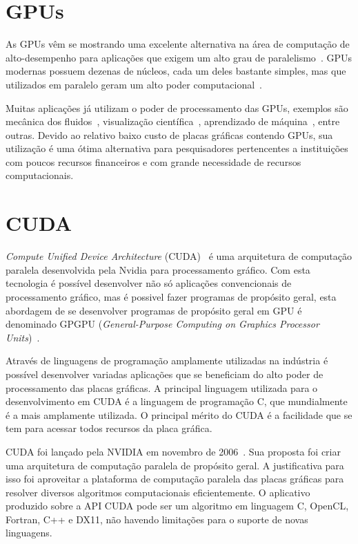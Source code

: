 \section{GPUs}\label{intro:historico}

As GPUs vêm se mostrando uma excelente alternativa na área de computação de alto-desempenho para aplicações que exigem um alto grau de paralelismo~\citep{gpu}. GPUs modernas possuem dezenas de núcleos, cada um deles bastante simples, mas que utilizados em paralelo geram um alto poder computacional~\citep{cuda}.

Muitas aplicações já utilizam o poder de processamento das GPUs, exemplos são mecânica dos fluidos~\citep{fluido}, visualização científica~\citep{visualizacao},  aprendizado de máquina~\citep{Aprendizado}, entre outras. Devido ao relativo baixo custo de placas gráficas contendo GPUs, sua utilização é uma ótima alternativa para pesquisadores pertencentes a instituições com poucos recursos financeiros e com grande necessidade de recursos computacionais.


\section{CUDA}\label{intro:contexto}

\textit{Compute Unified Device Architecture} (CUDA)~\citep{cuda} é uma arquitetura de computação paralela desenvolvida pela Nvidia para processamento gráfico.
Com esta tecnologia é possível desenvolver não só aplicações convencionais de processamento gráfico, mas é possivel fazer programas de propósito geral, esta abordagem de se desenvolver programas de propósito geral em GPU é denominado GPGPU (\textit{General-Purpose Computing on Graphics Processor Units})~\citep{GPGPU}.

Através de linguagens de programação amplamente utilizadas na indústria é possível desenvolver variadas aplicações que se beneficiam do alto poder de processamento das placas gráficas. A principal linguagem utilizada para o desenvolvimento em CUDA é a linguagem de
programação C, que mundialmente é a mais amplamente utilizada. O principal mérito do CUDA é a facilidade que se tem para acessar todos recursos da placa gráfica.

CUDA foi lançado pela NVIDIA em novembro de 2006~\citep{cuda}. Sua proposta foi criar uma arquitetura de computação paralela de propósito geral. A justificativa para isso foi aproveitar a plataforma de computação paralela das placas gráficas para resolver diversos algoritmos
computacionais eficientemente. O aplicativo produzido sobre a API CUDA pode ser um algoritmo em linguagem C, OpenCL, Fortran, C++ e DX11, não havendo limitações para o suporte de novas linguagens. 

